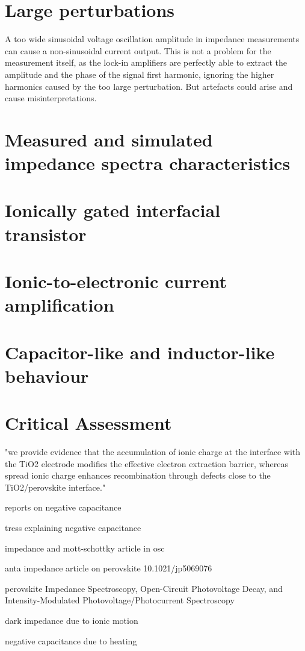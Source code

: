 \section{Large perturbations}\label{impedance-large_perturbations}

A too wide sinusoidal voltage oscillation amplitude in impedance measurements can cause a non-sinusoidal current output.
This is not a problem for the measurement itself, as the lock-in amplifiers are perfectly able to extract the amplitude and the phase of the signal first harmonic, ignoring the higher harmonics caused by the too large perturbation.
But artefacts could arise and cause misinterpretations.


\section{Measured and simulated impedance spectra characteristics}
\section{Ionically gated interfacial transistor}


\section{Ionic-to-electronic current amplification}
\section{Capacitor-like and inductor-like behaviour}
\section{Critical Assessment}

"we provide evidence that the accumulation of ionic charge at the interface with the TiO2 electrode modifies the effective electron extraction barrier, whereas spread ionic charge enhances recombination through defects close to the TiO2/perovskite interface." \cite{Tress2016}

reports on negative capacitance \cite{Sanchez2014}

tress explaining negative capacitance \cite{Ebadi2019}

impedance and mott-schottky article in osc \cite{Brus2016}

anta impedance article on perovskite 10.1021/jp5069076

perovskite Impedance Spectroscopy, Open-Circuit Photovoltage Decay, and Intensity-Modulated Photovoltage/Photocurrent Spectroscopy \cite{Pockett2015}

dark impedance due to ionic motion \cite{Yang2015e}

negative capacitance due to heating \cite{Knapp2015}